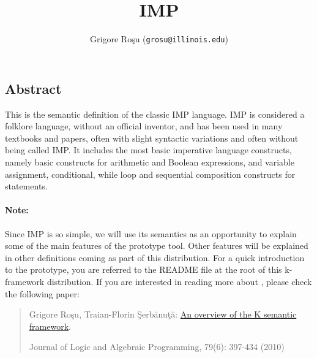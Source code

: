 \setlength{\parindent}{1em}
\title{IMP}
\author{Grigore Ro\c{s}u (\texttt{grosu@illinois.edu})}

\maketitle

\begin{latexComment}
\section{Abstract}
This is the \K semantic definition of the classic IMP language.
IMP is considered a folklore language, without an official inventor,
and has been used in many textbooks and papers, often with slight
syntactic variations and often without being called IMP\@.  It includes
the most basic imperative language constructs, namely basic constructs
for arithmetic and Boolean expressions, and variable assignment,
conditional, while loop and sequential composition constructs for statements.

\paragraph{Note:}{
Since IMP is so simple, we will use its semantics as an opportunity to
explain some of the main features of the \K  prototype tool.  Other
features will be explained in other \K definitions coming as part of
this distribution.  For a quick introduction to the \K prototype, you
are referred to the README file at the root of this k-framework
distribution.  If you are interested in reading more about \K, please
check the following paper:
\begin{quote}
Grigore Ro\c su, Traian-Florin \c Serb\u anu\c t\u a:
\href{http://dx.doi.org/10.1016/j.jlap.2010.03.012}
     {An overview of the K semantic framework}.

Journal of Logic and Algebraic Programming, 79(6): 397-434 (2010)
\end{quote}
}


\end{latexComment}
